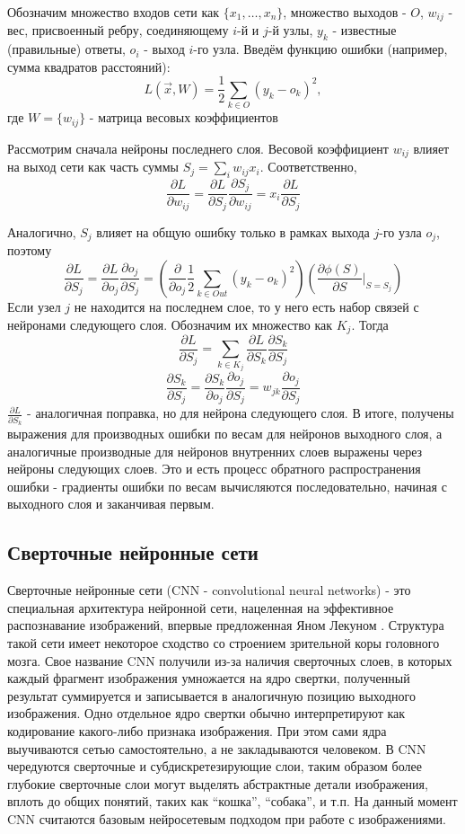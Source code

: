 		Обозначим множество входов сети как $\{x_1, \ldots, x_n\}$, множество выходов - $O$, $w_{ij}$ - вес, присвоенный ребру, соединяющему $i$-й и $j$-й узлы, $y_k$ - известные (правильные) ответы, $o_i$ - выход $i$-го узла. Введём функцию ошибки (например, сумма квадратов расстояний):
		$$ L(\vec{x}, W) = \frac{1}{2} \sum_{k \in O} (y_k - o_k)^2, $$
		где $W = \{w_{ij}\}$ - матрица весовых коэффициентов
		
		Рассмотрим сначала нейроны последнего слоя. Весовой коэффициент $w_{ij}$ влияет на выход сети как часть суммы $S_j = \sum_i w_{ij} x_i$. Соответственно,
		$$ \frac{\partial L}{\partial w_{ij}} = \frac{\partial L}{\partial S_j} \frac{\partial S_j}{\partial w_{ij}} = x_i \frac{\partial L}{\partial S_j} $$
		
		Аналогично, $S_j$ влияет на общую ошибку только в рамках выхода $j$-го узла $o_j$, поэтому
		$$ \frac{\partial L}{\partial S_j} = \frac{\partial L}{\partial o_j} \frac{\partial o_j}{\partial S_j}  = \left(\frac{\partial}{\partial o_j} \frac{1}{2} \sum_{k \in Out} (y_k - o_k)^2 \right) \left(\frac{\partial \phi(S)}{\partial S} \bigg|_{S = S_j} \right)$$
		Если узел $j$ не находится на последнем слое, то у него есть набор связей с нейронами следующего слоя. Обозначим их множество как $K_j$. Тогда
		$$ \frac{\partial L}{\partial S_j} = \sum_{k \in K_j} \frac{\partial L}{\partial S_k} \frac{\partial S_k}{\partial S_j} $$
		$$ \frac{\partial S_k}{\partial S_j} = \frac{\partial S_k}{\partial o_j} \frac{\partial o_j}{\partial S_j} = w_{jk}\frac{\partial o_j}{\partial S_j} $$
		$ \frac{\partial L}{\partial S_k}$ - аналогичная поправка, но для нейрона следующего слоя. В итоге, получены выражения для производных ошибки по весам для нейронов выходного слоя, а аналогичные производные для нейронов внутренних слоев выражены через нейроны следующих слоев. Это и есть процесс обратного распространения ошибки - градиенты ошибки по весам вычисляются последовательно, начиная с выходного слоя и заканчивая первым.
	\subsection{Сверточные нейронные сети}
		Сверточные нейронные сети (CNN - convolutional neural networks) - это специальная архитектура нейронной сети, нацеленная на эффективное распознавание изображений, впервые предложенная Яном Лекуном \cite{CNN-original}. Структура такой сети имеет некоторое сходство со строением зрительной коры головного мозга. Свое название CNN получили из-за наличия сверточных слоев, в которых каждый фрагмент изображения умножается на ядро свертки, полученный результат суммируется и записывается в аналогичную позицию выходного изображения. Одно отдельное ядро свертки обычно интерпретируют как кодирование какого-либо признака изображения. При этом сами ядра выучиваются сетью самостоятельно, а не закладываются человеком. В CNN чередуются сверточные и субдискретезирующие слои, таким образом более глубокие сверточные слои могут выделять абстрактные детали изображения, вплоть до общих понятий, таких как ``кошка'', ``собака'', и т.п. На данный момент CNN считаются базовым нейросетевым подходом при работе с изображениями.
